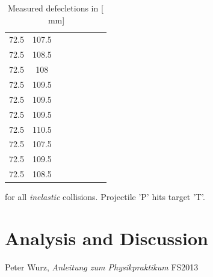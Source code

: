\documentclass{scrreprt}
\newcommand{\unit}[1]{\ensuremath{\, \mathrm{#1}}}
\renewcommand{\emph}[1]{\textit{#1}}
\begin{document}
\begin{table}[H]
\begin{tabular}{ccp{1.5cm}ccp{1.5cm}cc}
     72.5 &         107.5 &            &            &            &            &            &            \\
     72.5 &         108.5 &            &            &            &            &            &            \\
     72.5 &         108 &            &            &            &            &            &            \\
     72.5 &         109.5 &            &            &            &            &            &            \\
     72.5 &         109.5 &            &            &            &            &            &            \\
     72.5 &         109.5 &            &            &            &            &            &            \\
     72.5 &         110.5 &            &            &            &            &            &            \\
     72.5 &         107.5 &            &            &            &            &            &            \\
     72.5 &         109.5 &            &            &            &            &            &            \\
     72.5 &         108.5 &            &            &            &            &            &            \\
\end{tabular}  
\caption{Measured defecletions in [$\unit{mm}$]} for all \emph{inelastic} collisions. Projectile 'P' hits target 'T'.   
\end{table}

\section{Analysis and Discussion}

\begin{thebibliography}{9}

  Peter Wurz,
  \emph{Anleitung zum Physikpraktikum}
  FS2013

\end{thebibliography}
\end{document}
